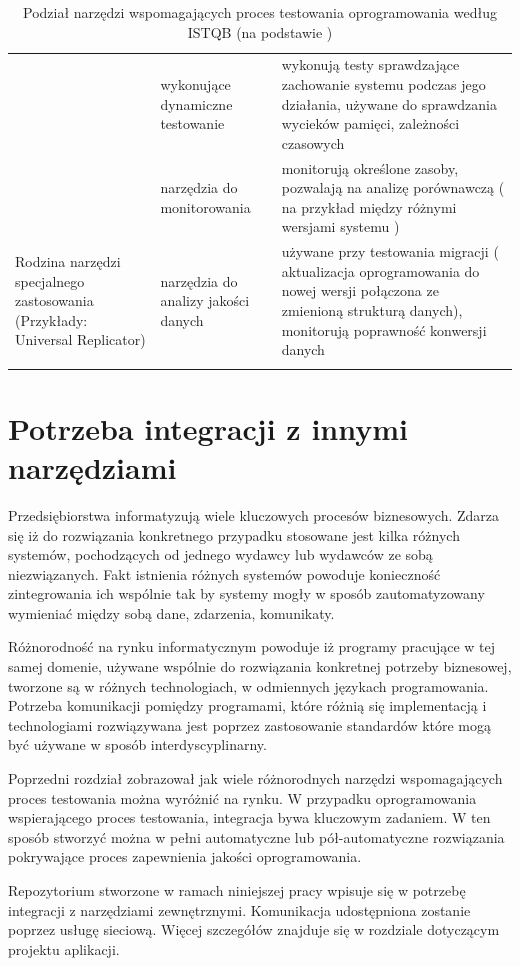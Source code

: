 \begin{longtable}{| p{4cm} | p{4cm} | p{8cm} |}
& wykonujące dynamiczne testowanie & wykonują testy sprawdzające zachowanie systemu podczas jego działania, używane do sprawdzania wycieków pamięci, zależności czasowych \\ \cline{2-3}
& narzędzia do monitorowania & monitorują określone zasoby, pozwalają na analizę porównawczą ( na przykład między różnymi wersjami systemu ) \\ \hline
\hline
\multirow{1}{4cm}{Rodzina narzędzi specjalnego zastosowania (Przykłady: Universal Replicator\cite{replicator})} &
narzędzia do analizy jakości danych & używane przy testowania migracji ( aktualizacja oprogramowania do nowej wersji połączona ze zmienioną strukturą danych), monitorują poprawność konwersji danych \\
\hline
\caption{Podział narzędzi wspomagających proces testowania oprogramowania według ISTQB (na podstawie  \cite{istqb})}\\
\end{longtable}

\section{Potrzeba integracji z innymi narzędziami}

Przedsiębiorstwa informatyzują wiele kluczowych procesów biznesowych. Zdarza się iż do rozwiązania konkretnego przypadku stosowane jest kilka różnych systemów, pochodzących od jednego wydawcy lub wydawców ze sobą niezwiązanych. Fakt istnienia różnych systemów powoduje konieczność zintegrowania ich wspólnie tak by systemy mogły w sposób zautomatyzowany wymieniać między sobą dane, zdarzenia, komunikaty.

Różnorodność na rynku informatycznym powoduje iż programy pracujące w tej samej domenie, używane wspólnie do rozwiązania konkretnej potrzeby biznesowej, tworzone są w różnych technologiach, w odmiennych językach programowania. Potrzeba komunikacji pomiędzy programami, które różnią się implementacją i technologiami rozwiązywana jest poprzez zastosowanie standardów które mogą być używane w sposób interdyscyplinarny.

Poprzedni rozdział zobrazował jak wiele różnorodnych narzędzi wspomagających proces testowania można wyróżnić na rynku. W przypadku oprogramowania wspierającego proces testowania, integracja bywa kluczowym zadaniem. W ten sposób stworzyć można w pełni automatyczne lub pół-automatyczne rozwiązania pokrywające proces zapewnienia jakości oprogramowania. 

Repozytorium stworzone w ramach niniejszej pracy wpisuje się w potrzebę integracji z narzędziami zewnętrznymi. Komunikacja udostępniona zostanie poprzez usługę sieciową. Więcej szczegółów znajduje się w rozdziale dotyczącym projektu aplikacji.

